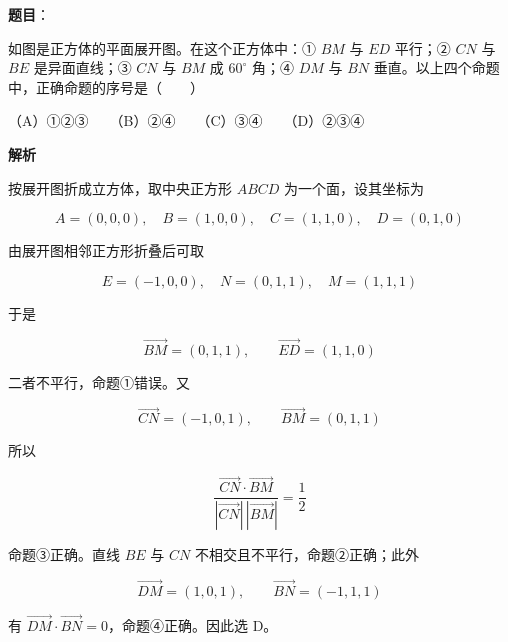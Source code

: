 \begin{answer}

\textbf{题目}：

如图是正方体的平面展开图。在这个正方体中：① $BM$ 与 $ED$ 平行；② $CN$ 与 $BE$ 是异面直线；③ $CN$ 与 $BM$ 成 $60^\circ$ 角；④ $DM$ 与 $BN$ 垂直。以上四个命题中，正确命题的序号是\mbox{（　　）}
\nopagebreak[4]
\begin{center}\end{center}
\nopagebreak[4]
（A）①②③　　（B）②④　　（C）③④　　（D）②③④

\textbf{解析}

按展开图折成立方体，取中央正方形 $ABCD$ 为一个面，设其坐标为

\nopagebreak[4]
\[
A=(0,0,0),\quad B=(1,0,0),\quad C=(1,1,0),\quad D=(0,1,0)
\]

由展开图相邻正方形折叠后可取

\nopagebreak[4]
\[
E=(-1,0,0),\quad N=(0,1,1),\quad M=(1,1,1)
\]

于是

\nopagebreak[4]
\[
\overrightarrow{BM}=(0,1,1),\qquad
\overrightarrow{ED}=(1,1,0)
\]

二者不平行，命题①错误。又

\nopagebreak[4]
\[
\overrightarrow{CN}=(-1,0,1),\qquad
\overrightarrow{BM}=(0,1,1)
\]

所以

\nopagebreak[4]
\[
\frac{\overrightarrow{CN}\cdot\overrightarrow{BM}}
{|\overrightarrow{CN}|\,|\overrightarrow{BM}|}
=\frac12
\]

命题③正确。直线 $BE$ 与 $CN$ 不相交且不平行，命题②正确；此外

\nopagebreak[4]
\[
\overrightarrow{DM}=(1,0,1),\qquad
\overrightarrow{BN}=(-1,1,1)
\]

有 $\overrightarrow{DM}\cdot\overrightarrow{BN}=0$，命题④正确。因此选 D。


\end{answer}

